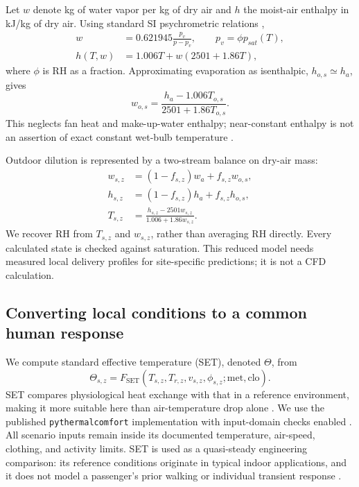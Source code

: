 \documentclass[12pt]{article}
\begin{document}
Let $w$ denote kg of water vapor per kg of dry air and $h$ the moist-air enthalpy in kJ/kg of dry air. Using standard SI psychrometric relations \cite{psychrolib},
\begin{align}
 w&=0.621945\frac{p_v}{p-p_v},\qquad p_v=\phi p_{sat}(T),\\
 h(T,w)&=1.006T+w(2501+1.86T),
\label{eq:enthalpy}
\end{align}
where $\phi$ is RH as a fraction. Approximating evaporation as isenthalpic, $h_{o,s}\simeq h_a$, gives
\begin{equation}
 w_{o,s}=\frac{h_a-1.006T_{o,s}}{2501+1.86T_{o,s}}.
\end{equation}
This neglects fan heat and make-up-water enthalpy; near-constant enthalpy is not an assertion of exact constant wet-bulb temperature \cite{evap}.

Outdoor dilution is represented by a two-stream balance on dry-air mass:
\begin{align}
 w_{s,z}&=(1-f_{s,z})w_a+f_{s,z}w_{o,s},\\
 h_{s,z}&=(1-f_{s,z})h_a+f_{s,z}h_{o,s},\\
 T_{s,z}&=\frac{h_{s,z}-2501w_{s,z}}{1.006+1.86w_{s,z}}.
\label{eq:mixing}
\end{align}
We recover RH from $T_{s,z}$ and $w_{s,z}$, rather than averaging RH directly. Every calculated state is checked against saturation. This reduced model needs measured local delivery profiles for site-specific predictions; it is not a CFD calculation.

\subsection{Converting local conditions to a common human response}

We compute standard effective temperature (SET), denoted $\Theta$, from
\begin{equation}
 \Theta_{s,z}=F_{\mathrm{SET}}(T_{s,z},T_{r,z},v_{s,z},\phi_{s,z};\mathrm{met},\mathrm{clo}).
\label{eq:set}
\end{equation}
SET compares physiological heat exchange with that in a reference environment, making it more suitable here than air-temperature drop alone \cite{thermalcomfort,fanguide}. We use the published \texttt{pythermalcomfort} implementation with input-domain checks enabled \cite{pythermal}. All scenario inputs remain inside its documented temperature, air-speed, clothing, and activity limits. SET is used as a quasi-steady engineering comparison: its reference conditions originate in typical indoor applications, and it does not model a passenger's prior walking or individual transient response \cite{thermalcomfort}.
\end{document}
